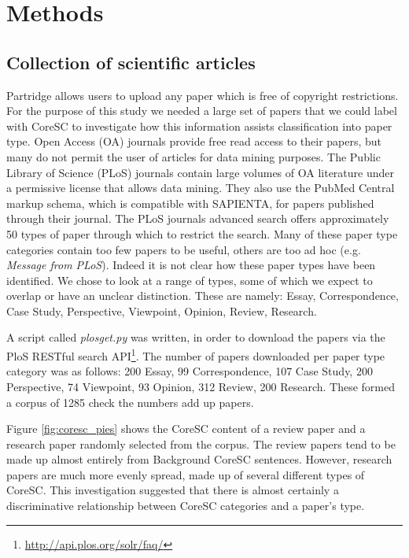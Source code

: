 \documentclass{svmult}
\begin{document}
\section{Methods}
\label{sec:2}

\subsection*{Collection of scientific articles} 
Partridge allows users to upload any paper which is free of copyright
restrictions.  For the purpose of this study we needed a large set of papers
that we could label with CoreSC to investigate how this information assists
classification into paper type.  Open Access (OA) journals provide free read
access to their papers, but many do not permit the user of articles for data
mining purposes. The Public Library of Science (PLoS) journals contain large
volumes of OA literature under a permissive license that allows data mining.
They also use the PubMed Central markup schema, which is compatible with
SAPIENTA, for papers published through their journal. The PLoS journals
advanced search offers approximately 50 types of paper through which to
restrict the search.  Many of these paper type categories contain too few
papers to be useful, others are too ad hoc (e.g.  {\it Message from PLoS}).
Indeed it is not clear how these paper types have been identified. We chose to
look at a range of types, some of which we expect to overlap or have an unclear
distinction.  These are namely: Essay, Correspondence, Case Study, Perspective,
Viewpoint, Opinion, Review, Research. 

A script called {\em plosget.py} was written, in order to download the
papers via the PloS RESTful search API\footnote{\url{http://api.plos.org/solr/faq/}}. The number of papers downloaded per
paper type category was as follows: 200 Essay, 99 Correspondence, 107 Case
Study, 200 Perspective, 74 Viewpoint, 93 Opinion, 312 Review, 200 Research.
These formed a corpus of 1285 %
check the numbers add up papers.

Figure \ref{fig:coresc_pies} shows the CoreSC content of a review paper and a
research paper randomly selected from the corpus.  The review papers tend to be
made up almost entirely from Background CoreSC sentences.  However, research
papers are much more evenly spread, made up of several different types of
CoreSC.  This investigation suggested that there is almost certainly a
discriminative relationship between CoreSC categories and a paper's type. 
\end{document}
